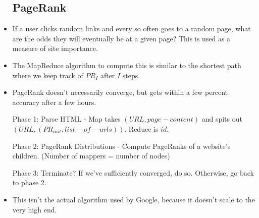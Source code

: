\documentclass{scrartcl}
\begin{document}
\begin{itemize}
\subsection*{PageRank}
\item If a user clicks random links and every so often goes to a random page,
	what are the odds they will eventually be at a given page? This is used as
	a measure of site importance.
\item The MapReduce algorithm to compute this is similar to the shortest path
	where we keep track of $PR_I$ after $I$ steps.
\item PageRank doesn't necessarily converge, but gets within a few percent
	accuracy after a few hours.
\item [Phase 1:] Parse HTML - Map takes $(URL, page-content)$ and spits out
	$(URL, (PR_{init}, list-of-urls))$. Reduce is $id$.
\item [Phase 2:] PageRank Distributions - Compute PageRanks of a website's
	children. (Number of mappers = number of nodes)
\item [Phase 3:] Terminate?  If we've sufficiently converged, do so. Otherwise,
	go back to phase 2.
\item This isn't the actual algorithm used by Google, because it doesn't scale
	to the very high end.
\end{itemize}
\end{document}
